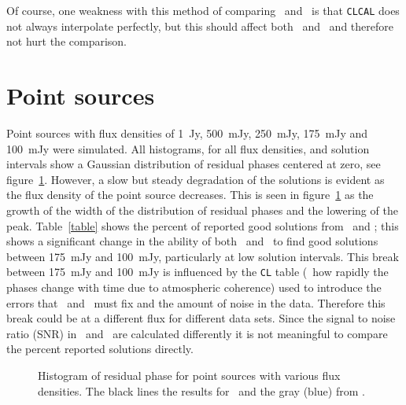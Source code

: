Of course, one weakness with this method of comparing
\KR\ and \FR\ is that {\tt CLCAL} does not always interpolate perfectly,
but this
should affect both \KR\ and \FR\ and therefore not hurt the comparison.

\section{Point sources}

Point sources with flux densities of 1~Jy, 500~mJy, 250~mJy, 175~mJy and
100~mJy were simulated.
All histograms, for all flux densities, and solution intervals show
a Gaussian distribution of residual phases centered at zero,
see figure~\ref{phase2}.  However, a slow but
steady degradation of the solutions is evident as the flux density of
the point source decreases.  This is seen in figure~\ref{phase2}
as the growth of the width of the distribution of residual phases and
the lowering of the peak.
Table~\ref{table} shows the percent of reported good solutions from \FR\ and
\KR; this shows a significant
change in the ability of both \FR\ and \KR\ to find
good solutions between 175~mJy and 100~mJy, particularly at low
solution intervals.  This break between 175~mJy and 100~mJy is influenced
by the {\tt CL} table (\eg\ how rapidly the phases change with time due
to atmospheric coherence)
used to introduce the errors that \KR\ and \FR\ must fix and the amount
of noise in the data.  Therefore this break could be at a different flux
for different data sets.   Since the signal to noise ratio (SNR)
in \KR\ and
\FR\ are calculated differently it is not meaningful to compare the percent
reported solutions directly.

\begin{figure}[t!]
\caption{Histogram of residual phase for point sources with various
flux densities.  The black lines the results for \FR\ and the gray (blue)
from \KR\@.}
\label{phase2}
\end{figure}

